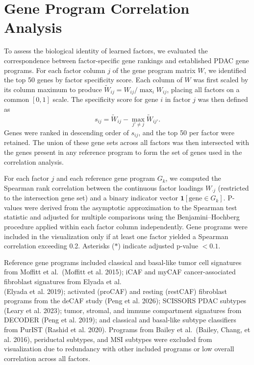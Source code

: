 \documentclass[
]{article}
\begin{document}
\section{Gene Program Correlation Analysis}

To assess the biological identity of learned factors, we evaluated the
correspondence between factor-specific gene rankings and established
PDAC gene programs. For each factor column \(j\) of the gene program
matrix \(W\), we identified the top 50 genes by factor specificity
score. Each column of \(W\) was first scaled by its column maximum to
produce \(\tilde{W}_{ij} = W_{ij} /
\max_i W_{ij}\), placing all factors on a common \([0,1]\) scale. The
specificity score for gene \(i\) in factor \(j\) was then defined as
\[s_{ij} = \tilde{W}_{ij} - \max_{j' \neq j} \tilde{W}_{ij'}.\] Genes
were ranked in descending order of \(s_{ij}\), and the top 50 per factor
were retained. The union of these gene sets across all factors was then
intersected with the genes present in any reference program to form the
set of genes used in the correlation analysis.

For each factor \(j\) and each reference gene program \(G_k\), we
computed the Spearman rank correlation between the continuous factor
loadings \(W_{\cdot j}\) (restricted to the intersection gene set) and a
binary indicator vector \(\mathbf{1}[\text{gene} \in G_k]\). P-values
were derived from the asymptotic approximation to the Spearman test
statistic and adjusted for multiple comparisons using the
Benjamini--Hochberg procedure applied within each factor column
independently. Gene programs were included in the visualization only if
at least one factor yielded a Spearman correlation exceeding 0.2.
Asterisks (\(*\)) indicate adjusted p-value \(< 0.1\).

Reference gene programs included classical and basal-like tumor cell
signatures from Moffitt et al.~(Moffitt et al. 2015); iCAF and myCAF
cancer-associated fibroblast signatures from Elyada et al.\\
(Elyada et al. 2019); activated (proCAF) and resting (restCAF)
fibroblast programs from the deCAF study (Peng et al. 2026); SCISSORS
PDAC subtypes (Leary et al. 2023); tumor, stromal, and immune
compartment signatures from DECODER (Peng et al. 2019); and classical
and basal-like subtype classifiers from PurIST (Rashid et al. 2020).
Programs from Bailey et al.~(Bailey, Chang, et al. 2016), periductal
subtypes, and MSI subtypes were excluded from visualization due to
redundancy with other included programs or low overall correlation
across all factors.
\end{document}
